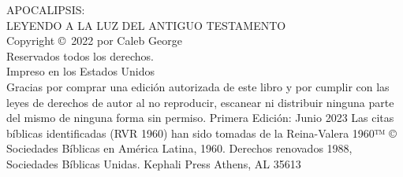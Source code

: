 \pagestyle{empty}
\frontmatter


\titleGM

\clearpage

\begin{vplace}[2]
\noindent
APOCALIPSIS: \\LEYENDO A LA LUZ DEL ANTIGUO TESTAMENTO\\
\newline
Copyright \copyright\ 2022 por Caleb George\\
Reservados todos los derechos.\\
\newline
Impreso en los Estados Unidos\\
\newline
Gracias por comprar una edición autorizada de este libro y por cumplir con las leyes de derechos de autor al no reproducir, escanear ni distribuir ninguna parte del mismo de ninguna forma sin permiso.
\newline
\newline
Primera Edición: Junio 2023
\newline
\newline
Las citas bíblicas identificadas (RVR 1960) han sido tomadas de la Reina-Valera 1960™ © Sociedades Bíblicas en América Latina, 1960. Derechos renovados 1988, Sociedades Bíblicas Unidas.
\newline
\newline
Kephali Press
\newline
Athens, AL 35613
\end{vplace}

\clearpage
\clearpage

\dedication
\clearpage


